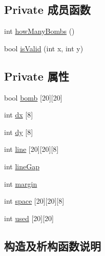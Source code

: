 \subsection*{Private 成员函数}
\begin{DoxyCompactItemize}
\item 
int \hyperlink{classchess_board_aa8c4b6997ffcdb121db319a1044f9658_aa8c4b6997ffcdb121db319a1044f9658}{how\+Many\+Bombs} ()
\item 
bool \hyperlink{classchess_board_ad0989442267fe68010ea2a289ec96344_ad0989442267fe68010ea2a289ec96344}{is\+Valid} (int x, int y)
\end{DoxyCompactItemize}
\subsection*{Private 属性}
\begin{DoxyCompactItemize}
\item 
bool \hyperlink{classchess_board_a6453bf0ce62eed140d37b294f3a4a8e8_a6453bf0ce62eed140d37b294f3a4a8e8}{bomb} \mbox{[}20\mbox{]}\mbox{[}20\mbox{]}
\item 
int \hyperlink{classchess_board_ac58f8fcb6344bb304616e95fd4773b5c_ac58f8fcb6344bb304616e95fd4773b5c}{dx} \mbox{[}8\mbox{]}
\item 
int \hyperlink{classchess_board_ac3fc44ec8c748e37f1e92dda4be8c03a_ac3fc44ec8c748e37f1e92dda4be8c03a}{dy} \mbox{[}8\mbox{]}
\item 
int \hyperlink{classchess_board_ad191786c9f76831e99699b315b24b1a5_ad191786c9f76831e99699b315b24b1a5}{line} \mbox{[}20\mbox{]}\mbox{[}20\mbox{]}\mbox{[}8\mbox{]}
\item 
int \hyperlink{classchess_board_aa871a25deb0dc97adcf79da0ce150467_aa871a25deb0dc97adcf79da0ce150467}{line\+Gap}
\item 
int \hyperlink{classchess_board_a86e2369dc84aac0e8c2ff5dfe395c9fa_a86e2369dc84aac0e8c2ff5dfe395c9fa}{margin}
\item 
int \hyperlink{classchess_board_a6ce69698dd39a950ccb031851296e9f7_a6ce69698dd39a950ccb031851296e9f7}{space} \mbox{[}20\mbox{]}\mbox{[}20\mbox{]}\mbox{[}8\mbox{]}
\item 
int \hyperlink{classchess_board_a606a859d2b32d470d04b0115ececc200_a606a859d2b32d470d04b0115ececc200}{used} \mbox{[}20\mbox{]}\mbox{[}20\mbox{]}
\end{DoxyCompactItemize}


\subsection{构造及析构函数说明}
